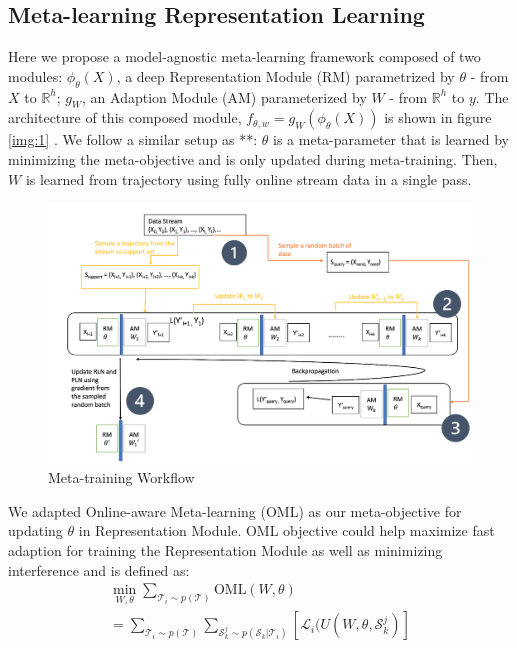 \subsection{Meta-learning Representation Learning}
\label{sec:mlr}
Here we propose a model-agnostic meta-learning framework composed of two modules: $\phi_\theta(X)$, a deep Representation Module (RM) parametrized by $\theta$ - from $X$ to $\mathbb{R} ^ {h}$; $g_W$, an Adaption Module (AM) parameterized by $W$ - from $\mathbb{R} ^ {h}$ to $y$. The architecture of this composed module, $f_{\theta, w} = g_W(\phi_\theta(X))$ is shown in figure \ref{img:1} . We follow a similar setup as **: $\theta$ is a meta-parameter that is learned by minimizing the meta-objective and is only updated during meta-training. Then, $W$ is learned from trajectory using fully online stream data in a single pass.
\begin{figure}[ht]
\centering
    \includegraphics[scale=0.6]{imgs/meta-training.png}
    \caption{Meta-training Workflow}
    \label{img:2}
\end{figure}

We adapted Online-aware Meta-learning (OML) as our meta-objective for updating $\theta$ in Representation Module. OML objective could help maximize fast adaption for training the Representation Module as well as minimizing interference and is defined as:
\begin{equation}
    \begin{aligned}
       \min_{W, \theta} \sum_{\mathcal{T}_i \sim p(\mathcal{T})} \mathrm{OML}(W, \theta) \\
       = \sum_{\mathcal{T}_i \sim p(\mathcal{T})} \sum_{\mathcal{S}_k ^ j \sim p(\mathcal{S}_k | \mathcal{T}_i)} [\mathcal{L}_i (U(W, \theta, \mathcal{S}_k ^ j)]
   \end{aligned}
\end{equation}

